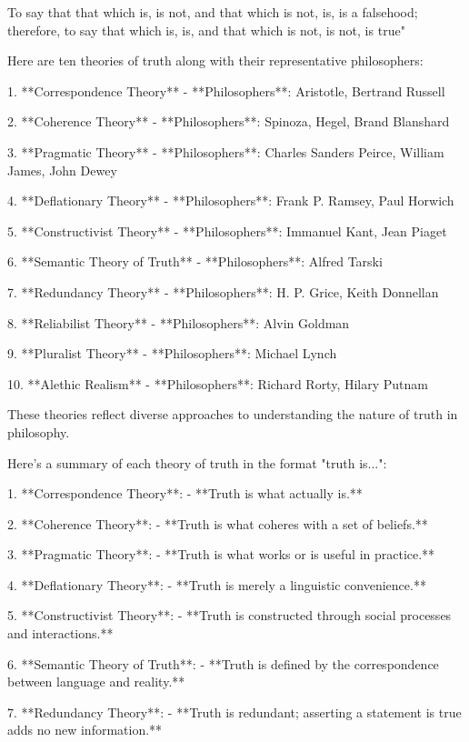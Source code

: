 

To say that that which is, is not, and that which is not, is, is a falsehood; therefore, to say that which is, is, and that which is not, is not, is true"


Here are ten theories of truth along with their representative philosophers:

1. **Correspondence Theory**  
   - **Philosophers**: Aristotle, Bertrand Russell

2. **Coherence Theory**  
   - **Philosophers**: Spinoza, Hegel, Brand Blanshard

3. **Pragmatic Theory**  
   - **Philosophers**: Charles Sanders Peirce, William James, John Dewey

4. **Deflationary Theory**  
   - **Philosophers**: Frank P. Ramsey, Paul Horwich

5. **Constructivist Theory**  
   - **Philosophers**: Immanuel Kant, Jean Piaget

6. **Semantic Theory of Truth**  
   - **Philosophers**: Alfred Tarski

7. **Redundancy Theory**  
   - **Philosophers**: H. P. Grice, Keith Donnellan

8. **Reliabilist Theory**  
   - **Philosophers**: Alvin Goldman

9. **Pluralist Theory**  
   - **Philosophers**: Michael Lynch

10. **Alethic Realism**  
    - **Philosophers**: Richard Rorty, Hilary Putnam

These theories reflect diverse approaches to understanding the nature of truth in philosophy.


Here’s a summary of each theory of truth in the format "truth is...":

1. **Correspondence Theory**:  
   - **Truth is what actually is.**

2. **Coherence Theory**:  
   - **Truth is what coheres with a set of beliefs.**

3. **Pragmatic Theory**:  
   - **Truth is what works or is useful in practice.**

4. **Deflationary Theory**:  
   - **Truth is merely a linguistic convenience.**

5. **Constructivist Theory**:  
   - **Truth is constructed through social processes and interactions.**

6. **Semantic Theory of Truth**:  
   - **Truth is defined by the correspondence between language and reality.**

7. **Redundancy Theory**:  
   - **Truth is redundant; asserting a statement is true adds no new information.**

